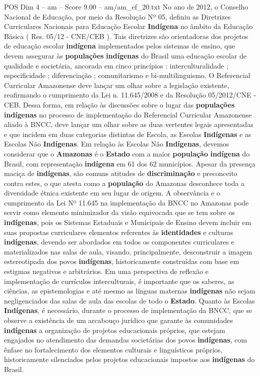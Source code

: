\begin{textsample}{POS Dim 4 – am – Score 9.00 – am/am\_ef\_20.txt}
No ano de 2012, o Conselho Nacional de Educação, por meio da Resolução Nº 05, definiu as Diretrizes Curriculares Nacionais para Educação Escolar \textbf{Indígena} no âmbito da Educação Básica ( Res. 05/12 - CNE/CEB ).
Tais diretrizes são orientadoras dos projetos de educação escolar \textbf{indígena} implementados pelos sistemas de ensino, que devem assegurar às \textbf{populações} \textbf{indígenas} do Brasil uma educação escolar de qualidade e societária, ancorada em cinco princípios : interculturalidade ; especificidade ; diferenciação ; comunitarismo e bi-multilinguismo.
O Referencial Curricular Amazonense deve lançar um olhar sobre a legislação existente, reafirmando o cumprimento da Lei n. 11.645/2008 e da Resolução 05/2012/CNE - CEB.
Dessa forma, em relação às discussões sobre o lugar das \textbf{populações} \textbf{indígenas} no processo de implementação do Referencial Curricular Amazonense aliado à BNCC, deve lançar um olhar sobre as duas vertentes legais apresentadas e que incidem em duas categorias distintas de Escola, as Escolas \textbf{Indígenas} e as Escolas Não \textbf{Indígenas}.
Em relação às Escolas Não \textbf{Indígenas}, devemos considerar que o \textbf{Amazonas} é o \textbf{Estado} com a maior \textbf{população} \textbf{indígena} do Brasil, com representação \textbf{indígena} em 61 dos 62 municípios.
Apesar da presença maciça de \textbf{indígenas}, são comuns atitudes de \textbf{discriminação} e preconceito contra estes, o que atesta como a \textbf{população} do Amazonas desconhece toda a diversidade étnica existente em seu lugar de origem.
A observância e o cumprimento da Lei Nº 11.645 na implementação da BNCC no Amazonas pode servir como elemento minimizador da visão equivocada que se tem sobre os \textbf{indígenas}, pois os Sistemas Estaduais e Municipais de Ensino devem incluir em suas propostas curriculares elementos referentes às \textbf{identidades} e culturas \textbf{indígenas}, devendo ser abordados em todos os componentes curriculares e materializados nas salas de aula, visando, principalmente, desconstruir a imagem estereotipada dos povos \textbf{indígenas}, historicamente construídas com base em estigmas negativos e arbitrários.
Em uma perspectiva de reflexão e implementação de currículos interculturais, é importante que os saberes, as ciências, as epistemologias e até mesmo as línguas maternas \textbf{indígenas} não sejam negligenciados das salas de aula das escolas de todo o \textbf{Estado}.
Quanto às Escolas \textbf{Indígenas}, é necessário, durante o processo de implementação da BNCC, que se observe a existência de um arcabouço jurídico que garante às comunidades \textbf{indígenas} a organização de projetos educacionais próprios, que estejam engajados no atendimento das demandas societárias dos povos \textbf{indígenas}, com ênfase no fortalecimento dos elementos culturais e linguísticos próprios, historicamente silenciados pelos projetos educacionais impostos aos \textbf{indígenas} do Brasil.

\end{textsample}
